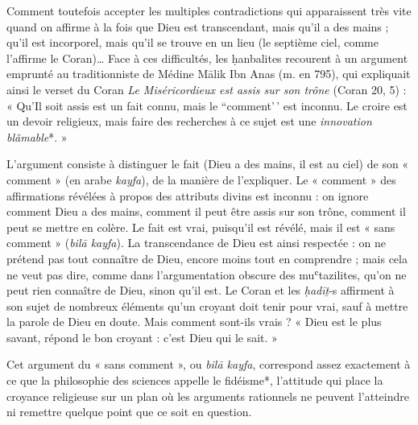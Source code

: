 Comment toutefois accepter les multiples contradictions qui apparaissent
très vite quand on affirme à la fois que Dieu est transcendant, mais
qu'il a des mains ; qu'il est incorporel, mais qu'il se trouve en un
lieu (le septième ciel, comme l'affirme le Coran)\ldots{} Face à ces
difficultés, les ḥanbalites recourent à un argument emprunté au
traditionniste de Médine Mālik Ibn Anas (m. en 795), qui expliquait
ainsi le verset du Coran \emph{Le Miséricordieux est assis sur son
trône} (Coran 20, 5) : « Qu'Il soit assis est un fait connu, mais le
``comment'\,' est inconnu. Le croire est un devoir religieux, mais faire
des recherches à ce sujet est une \emph{innovation blâmable}*. »

L'argument consiste à distinguer le fait (Dieu a des mains, il est au
ciel) de son
« comment » (en arabe \emph{kayfa}), de la manière de l'expliquer. Le «
comment » des affirmations révélées à propos des attributs divins est
inconnu : on ignore comment Dieu a des mains, comment il peut être assis
sur son trône, comment il peut se mettre en colère. Le fait est vrai,
puisqu'il est révélé, mais il est « sans comment » (\emph{bilā kayfa}).
La transcendance de Dieu est ainsi respectée : on ne prétend pas tout
connaître de Dieu, encore moins tout en comprendre ; mais cela ne veut
pas dire, comme dans l'argumentation obscure des muʿtazilites, qu'on ne
peut rien connaître de Dieu, sinon qu'il est. Le Coran et les
\emph{ḥadīṯ}-s affirment à son sujet de nombreux éléments qu'un croyant
doit tenir pour vrai, sauf à mettre la parole de Dieu en doute. Mais
comment sont-ils vrais ? « Dieu est le plus savant, répond le bon
croyant : c'est Dieu qui le sait. »

Cet argument du « sans comment », ou \emph{bilā kayfa}, correspond assez
exactement à ce que la philosophie des sciences appelle le fidéisme*,
l'attitude qui place la croyance religieuse sur un plan où les arguments
rationnels ne peuvent l'atteindre ni remettre quelque point que ce soit
en question.

